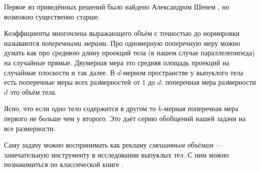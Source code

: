\begin{addedbytheeditors}
Первое из приведённых решений было найдено Александром Шенем \cite{shen}, но возможно существенно старше.

Коэффициенты многочлена выражающего объём с точностью до нормировки называются \emph{поперечными мерами}.
Про одномерную поперечную меру можно думать как про среднюю длину проекций тела (в нашем случае параллелепипеда) на случайные прямые.
Двумерная мера это средняя площадь проекций на случайные плоскости и так далее.
В $d$-мерном пространстве у выпуклого тела есть поперечные меры всех размерностей от $1$ до $d$;
поперечная мера размерности $d$ это объём тела.

Ясно, что если одно тело содержится в другом то $k$-мерная поперечная мера первого не больше чем у второго.
Это даёт серию обобщений нашей задачи на все размерности.

Саму задачу можно воспринимать как рекламу \emph{смешанным объёмам} --- замечательную инструменту в исследовании выпуклых тел.
С ним можно познакомиться по классической книге \cite{burago-zalgaller}.
\end{addedbytheeditors}
